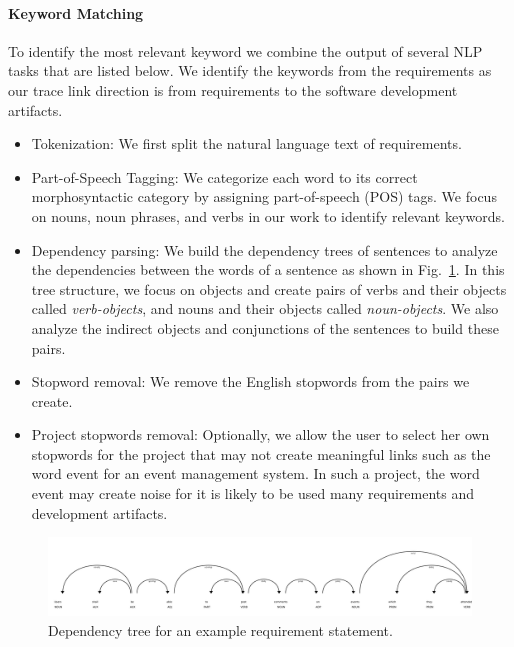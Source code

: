       \paragraph{Keyword Matching} To identify the most relevant keyword we combine the output of several NLP tasks that are listed below. We identify the keywords from the requirements as our trace link direction is from requirements to the software development artifacts.
      \begin{itemize}
      \item Tokenization: We first split the natural language text of requirements.
      \item Part-of-Speech Tagging: We categorize each word to its correct morphosyntactic category by assigning part-of-speech (POS) tags. We focus on nouns, noun phrases, and verbs in our work to identify relevant keywords.

      \item Dependency parsing: We build the dependency trees of sentences to analyze the dependencies between the words of a sentence as shown in Fig.~\ref{fig:deptree}. In this tree structure, we focus on objects and create pairs of verbs and their objects called \emph{verb-objects}, and nouns and their objects called \emph{noun-objects}. We also analyze the indirect objects and conjunctions of the sentences to build these pairs.


      \item Stopword removal: We remove the English stopwords from the pairs we create.


      \item Project stopwords removal: Optionally, we allow the user to select her own stopwords for the project that may not create meaningful links such as the word event for an event management system. In such a project, the word event may create noise for it is likely to be used many requirements and development artifacts.
      \end{itemize}


\begin{figure}[htbp]
    \centering
    \includegraphics[width=1\linewidth]{figs/displacy.png}
    \caption{Dependency tree for an example requirement statement.}
    \label{fig:deptree}
  \end{figure}

